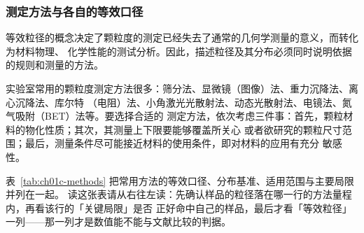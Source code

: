 
\subsubsection{测定方法与各自的等效口径}

等效粒径的概念决定了颗粒度的测定已经失去了通常的几何学测量的意义，而转化为材料物理、
化学性能的测试分析。因此，描述粒径及其分布必须同时说明依据的规则和测量的方法。

实验室常用的颗粒度测定方法很多：筛分法、显微镜（图像）法、重力沉降法、离心沉降法、库尔特
（电阻）法、小角激光光散射法、动态光散射法、电镜法、氮气吸附（BET）法等。要选择合适的
测定方法，依次考虑三件事：首先，颗粒材料的物化性质；其次，其测量上下限要能够覆盖所关心
或者欲研究的颗粒尺寸范围；最后，测量条件尽可能接近材料的使用条件，即对材料的应用有充分
敏感性。

表~\ref{tab:ch01c-methods} 把常用方法的等效口径、分布基准、适用范围与主要局限并列在一起。
读这张表请从右往左读：先确认样品的粒径落在哪一行的方法量程内，再看该行的「关键局限」是否
正好命中自己的样品，最后才看「等效粒径」一列——那一列才是数值能不能与文献比较的判据。

